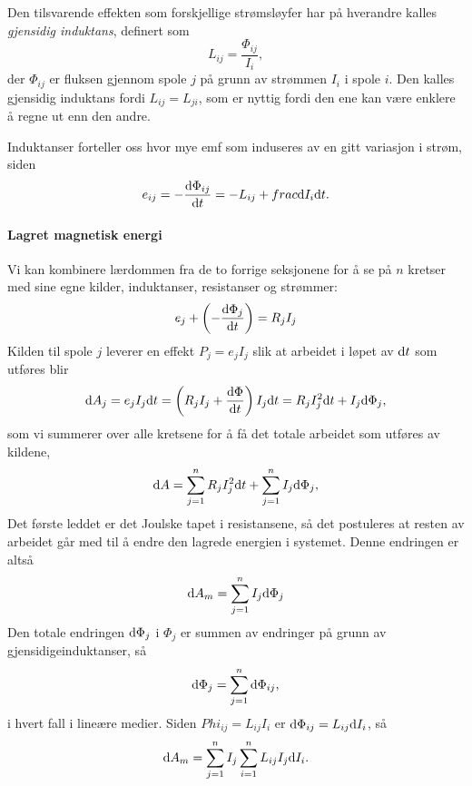 Den tilsvarende effekten som forskjellige strømsløyfer har på hverandre kalles \emph{gjensidig induktans}, definert som
\begin{equation}
	L_{ij}=\frac{\Phi_{ij}}{I_i},
\end{equation}
der $\Phi_{ij}$ er fluksen gjennom spole $j$ på grunn av strømmen $I_i$ i spole $i$. Den kalles gjensidig induktans fordi $L_{ij}=L_{ji}$, som er nyttig fordi den ene kan være enklere å regne ut enn den andre.

Induktanser forteller oss hvor mye emf som induseres av en gitt variasjon i strøm, siden
\begin{equation}
	e_{ij}=-\frac{\text{d}\Phi_{ij}}{\text{d}t}=-L_{ij}+frac{\text{d}I_i}{\text{d}t}.
\end{equation}

\paragraph{Lagret magnetisk energi} Vi kan kombinere lærdommen fra de to forrige seksjonene for å se på $n$ kretser med sine egne kilder, induktanser, resistanser og strømmer:
\begin{equation}
	e_j+\left(-\frac{\text{d}\Phi_j}{\text{d}t}\right)=R_jI_j
\end{equation}
Kilden til spole $j$ leverer en effekt $P_j=e_jI_j$ slik at arbeidet i løpet av $\text{d}t$ som utføres blir
\begin{equation}
	\text{d}A_j=e_jI_j\text{d}t=\left(R_jI_j+\frac{\text{d}\Phi}{\text{d}t}\right)I_j\text{d}t=R_jI_j^2\text{d}t+I_j\text{d}\Phi_j,
\end{equation}
som vi summerer over alle kretsene for å få det totale arbeidet som utføres av kildene,
\begin{equation}
	\text{d}A=\sum_{j=1}^nR_jI_j^2\text{d}t+\sum_{j=1}^nI_j\text{d}\Phi_j,
\end{equation}
Det første leddet er det Joulske tapet i resistansene, så det postuleres at resten av arbeidet går med til å endre den lagrede energien i systemet. Denne endringen er altså
\begin{equation}
	\text{d}A_m=\sum_{j=1}^nI_j\text{d}\Phi_j
\end{equation}
Den totale endringen $\text{d}\Phi_j$ i $\Phi_j$ er summen av endringer på grunn av gjensidigeinduktanser, så
\begin{equation}
	\text{d}\Phi_j=\sum_{j=1}^n\text{d}\Phi_{ij},
\end{equation}
i hvert fall i lineære medier. Siden $Phi_{ij}=L_{ij}I_i$ er $\text{d}\Phi_{ij}=L_{ij}\text{d}I_i$, så
\begin{equation}
	\text{d}A_m=\sum_{j=1}^nI_j\sum_{i=1}^nL_{ij}I_j\text{d}I_i.
\end{equation}
